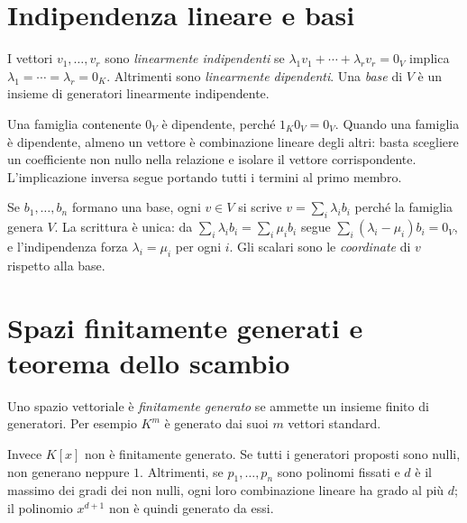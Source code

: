 \section{Indipendenza lineare e basi}
\begin{definizione}
I vettori $v_1,\ldots,v_r$ sono \emph{linearmente indipendenti} se
$\lambda_1v_1+\cdots+\lambda_rv_r=0_V$ implica
$\lambda_1=\cdots=\lambda_r=0_K$. Altrimenti sono
\emph{linearmente dipendenti}. Una \emph{base} di $V$ è un insieme di
generatori linearmente indipendente.
\end{definizione}
Una famiglia contenente $0_V$ è dipendente, perché $1_K0_V=0_V$.
Quando una famiglia è dipendente, almeno un vettore è combinazione
lineare degli altri: basta scegliere un coefficiente non nullo nella
relazione e isolare il vettore corrispondente. L'implicazione inversa
segue portando tutti i termini al primo membro.

Se $b_1,\ldots,b_n$ formano una base, ogni $v\in V$ si scrive
$v=\sum_i\lambda_i b_i$ perché la famiglia genera $V$. La scrittura è
unica: da $\sum_i\lambda_i b_i=\sum_i\mu_i b_i$ segue
$\sum_i(\lambda_i-\mu_i)b_i=0_V$, e l'indipendenza forza
$\lambda_i=\mu_i$ per ogni $i$. Gli scalari sono le \emph{coordinate}
di $v$ rispetto alla base.

\section{Spazi finitamente generati e teorema dello scambio}
\begin{definizione}
Uno spazio vettoriale è \emph{finitamente generato} se ammette un
insieme finito di generatori. Per esempio $K^m$ è generato dai suoi
$m$ vettori standard.
\end{definizione}
Invece $K[x]$ non è finitamente generato. Se tutti i generatori
proposti sono nulli, non generano neppure $1$. Altrimenti, se
$p_1,\ldots,p_n$ sono polinomi fissati e $d$ è il massimo dei gradi
dei non nulli, ogni loro combinazione lineare ha grado al più $d$;
il polinomio $x^{d+1}$ non è quindi generato da essi.

